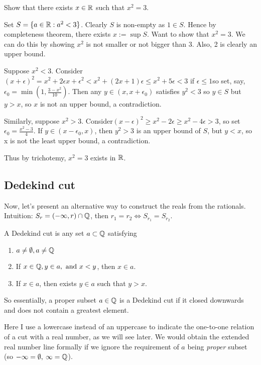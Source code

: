 \documentclass[11pt]{article}
\begin{document}
\begin{exercise}
  Show that there exists \(x \in \mathbb{R}\) such that \(x^2=3\).
\end{exercise}
\begin{solution}
  Set \(S=\{a\in\mathbb{R}:a^2<3\}\). Clearly \(S\) is non-empty as \(1\in S\). Hence by completeness theorem, there exists \(x:=\sup S\). Want to show that \(x^2=3\). We can do this by showing \(x^2\) is not smaller or not bigger than \(3\).
  Also, 2 is clearly an upper bound. 

  Suppose \(x^2<3\). Consider \((x+\epsilon)^2 = x^2+2\epsilon x+ \epsilon^2 < x^2+(2x+1)\epsilon \leq x^2+5\epsilon<3\) if \(\epsilon\leq 1\)so set, say, \(\epsilon_0=\min(1,\frac{3-x^2}{10})\). Then any \(y\in (x,x+\epsilon_0)\) satisfies \(y^2<3\) so \(y\in S\) but \(y>x\), so \(x\) is not an upper bound, a contradiction.

  Similarly, suppose \(x^2>3\). Consider\((x-\epsilon)^2 \geq x^2-2\epsilon \geq x^2 - 4\epsilon>3\), so set \(\epsilon_0 = \frac{x^2-3}{4}\). If \(y \in (x-\epsilon_0, x)\), then \(y^2>3\) is an upper bound of \(S\), but \(y<x\), so x is not the least upper bound, a contradiction.

  Thus by trichotemy, \(x^2=3\) exists in \(\mathbb{R}\).
\end{solution}

\subsection{Dedekind cut}

Now, let's present an alternative way to construct the reals from the rationals. Intuition: \(S_r = (-\infty,r)\cap\mathbb{Q}\), then \(r_1=r_2 \iff S_{r_1}=S_{r_2}\).
\begin{definition}
  A Dedekind cut is any set \(a\subset\mathbb{Q}\) satisfying  
  \begin{enumerate}[label={(\Roman*)}]
    \item \(a\neq\emptyset, a\neq\mathbb{Q}\)
    \item If \(x\in\mathbb{Q},y\in a,\text{ and } x<y \), then \(x\in a\).
    \item If \(x\in a\), then exists \(y\in a\) such that \(y>x\).
  \end{enumerate}
  So essentially, a proper subset \(a\in\mathbb{Q}\) is a Dedekind cut if it closed downwards and does not contain a greatest element.
\end{definition}
Here I use a lowercase instead of an uppercase to indicate the one-to-one relation of a cut with a real number, as we will see later. We would obtain the extended real number line formally if we ignore the requirement of \(a\) being \emph{proper} subset (so \(-\infty=\emptyset,\:\infty=\mathbb{Q}\)).
\end{document}
